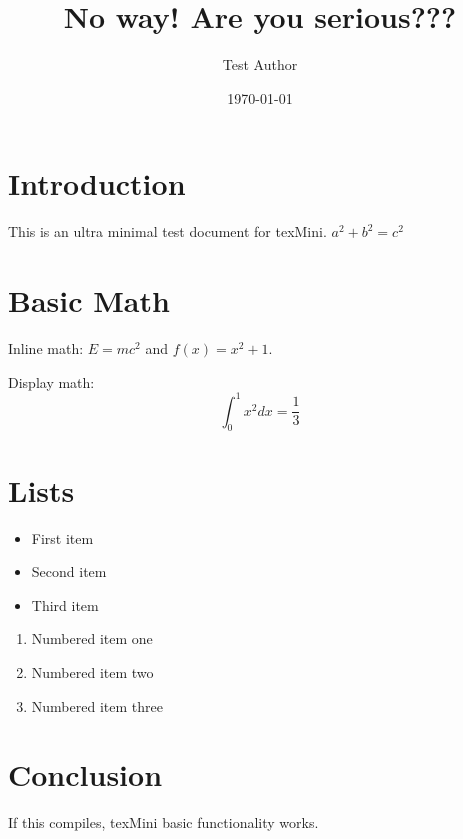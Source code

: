 \documentclass[11pt]{article}
\title{No way! Are you serious???}
\author{Test Author}
\date{\today}
\begin{document}
\maketitle

\section{Introduction}

This is an ultra minimal test document for texMini. $a^2 + b^2 = c^2$

\section{Basic Math}

Inline math: $E = mc^2$ and $f(x) = x^2 + 1$.

Display math:
\begin{equation}
    \int_0^1 x^2 dx = \frac{1}{3}
\end{equation}

\section{Lists}

\begin{itemize}
    \item First item
    \item Second item
    \item Third item
\end{itemize}

\begin{enumerate}
    \item Numbered item one
    \item Numbered item two
    \item Numbered item three
\end{enumerate}

\section{Conclusion}

If this compiles, texMini basic functionality works.
\end{document}

